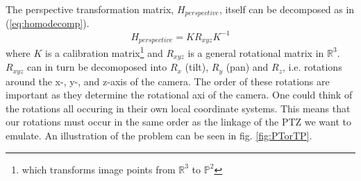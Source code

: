 	The perspective transformation matrix, $H_{perspective}$, itself can be decomposed as in (\ref{eq:homodecomp}).
	\begin{equation}
		H_{perspective}=KR_{xyz}K^{-1}
		\label{eq:homodecomp}
	\end{equation}
	where $K$ is a calibration matrix\footnote{which transforms image points from $\mathbb{R}^3$ to $\mathbb{P}^2$} and $R_{xyz}$ is a general rotational matrix in $\mathbb{R}^3$.
$R_{xyz}$ can in turn be decomoposed into $R_x$ (tilt), $R_y$ (pan) and $R_z$, i.e. rotations around the x-, y-, and z-axis of the camera.
The order of these rotations are important as they determine the rotational axi of the camera.
One could think of the rotations all occuring in their own local coordinate systems.
This means that our rotations must occur in the same order as the linkage of the PTZ we want to emulate.
An illustration of the problem can be seen in fig. \ref{fig:PTorTP}.

